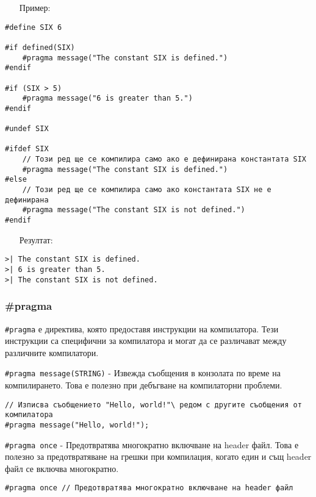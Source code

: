 \documentclass[oneside]{book}
\newcommand*{\code}[1]{\texttt{#1}}
\begin{document}
\begin{itemize}\item [Пример:]\end{itemize}
\begin{mdframed}\begin{lstlisting}
#define SIX 6

#if defined(SIX)
    #pragma message("The constant SIX is defined.")
#endif

#if (SIX > 5)
    #pragma message("6 is greater than 5.")
#endif

#undef SIX

#ifdef SIX
    // Този ред ще се компилира само ако е дефинирана константата SIX
    #pragma message("The constant SIX is defined.")
#else
    // Този ред ще се компилира само ако константата SIX не е дефинирана
    #pragma message("The constant SIX is not defined.")
#endif
\end{lstlisting}\end{mdframed}
\pagebreak
\begin{itemize}\item [Резултат:]\end{itemize}
\begin{mdframed}\begin{lstlisting}[language={}]
>| The constant SIX is defined.
>| 6 is greater than 5.
>| The constant SIX is not defined.
\end{lstlisting}\end{mdframed}
\subsubsection{\#pragma}
\code{\#pragma} е директива, която предоставя инструкции на компилатора. Тези инструкции са специфични за компилатора и могат да се различават между различните компилатори.

\code{\#pragma message(STRING)} - Извежда съобщения в конзолата по време на компилирането. Това е полезно при дебъгване на компилаторни проблеми.
\begin{mdframed}\begin{lstlisting}
// Изписва съобщението "Hello, world!"\ редом с другите съобщения от компилатора
#pragma message("Hello, world!");
\end{lstlisting}\end{mdframed}

\code{\#pragma once} - Предотвратява многократно включване на header файл. Това е полезно за предотвратяване на грешки при компилация, когато един и същ header файл се включва многократно.
\begin{mdframed}\begin{lstlisting}
#pragma once // Предотвратява многократно включване на header файл
\end{lstlisting}\end{mdframed}
\end{document}
